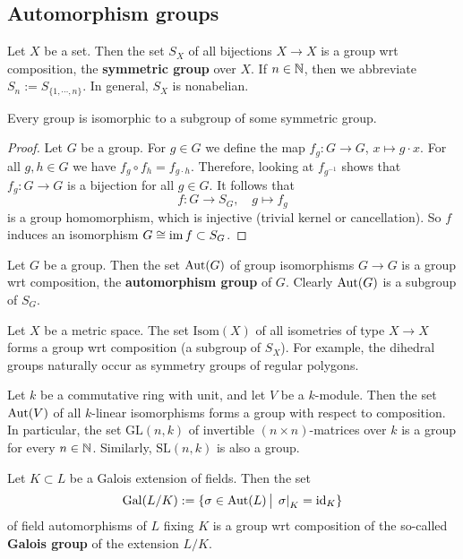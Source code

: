 \subsection{Automorphism groups}
\begin{example}
    Let $X$ be a set. Then the set $S_X$ of all bijections $X \to X$ is a group wrt composition, the \textbf{symmetric group} over $X$. If $n \in \mathbb{N}$, then we abbreviate $S_n  := S _{\{1,\cdots ,n\} }$. In general, $S_X$ is nonabelian.
\end{example}
\begin{prop}
   Every group is isomorphic to a subgroup of some symmetric group. 
\end{prop}
\begin{proof}
    Let $G$ be a group. For $g \in G$ we define the map $f_g \colon G \to G$, $x \mapsto g \cdot x$. For all $g, h \in G$ we have $f_g \circ f_h = f _{g \cdot h}$. Therefore, looking at $f _{g ^{-1}}$ shows that $f_g \colon G \to G$ is a bijection for all $g \in G$. It follows that \[
    f \colon G \to S_G, \quad g \mapsto f_g
\] is a group homomorphism, which is injective (trivial kernel or cancellation). So $f$ induces an isomorphism $G\cong \operatorname{im} f \subset S_G$.
\end{proof}
\begin{example}
    Let $G$ be a group. Then the set $\mathrm{Aut}(G)$ of group isomorphisms $G \to G$ is a group wrt composition, the \textbf{automorphism group} of $G$. Clearly $\mathrm{Aut}(G)$ is a subgroup of $S_G$. 
\end{example}
\begin{example}
    Let $X$ be a metric space. The set $\mathrm{Isom}(X)$ of all isometries of type $X \to X$ forms a group wrt composition (a subgroup of $S_X$). For example, the dihedral groups naturally occur as symmetry groups of regular polygons.
\end{example}
\begin{example}
    Let $k$ be a commutative ring with unit, and let $V$ be a $k$-module. Then the set $\mathrm{Aut}(V)$ of all $k$-linear isomorphisms forms a group with respect to composition.  In particular, the set $\mathrm{GL}(n,k)$ of invertible $(n \times n)$-matrices over $k$ is a group for every $n \in \mathbb{N}$. Similarly, $\mathrm{SL}(n,k)$ is also a group.
\end{example}
\begin{example}
    Let $K \subset L$ be a Galois extension of fields. Then the set \[
        \mathrm{Gal}(L / K) := \{\sigma \in \mathrm{Aut}(L) \, \big| \, \left. \sigma \right|_K = \operatorname{id}_K  \} 
        \]  of field automorphisms of $L$ fixing $K$ is a group wrt composition of the so-called \textbf{Galois group} of the extension $L /K$.
\end{example}
